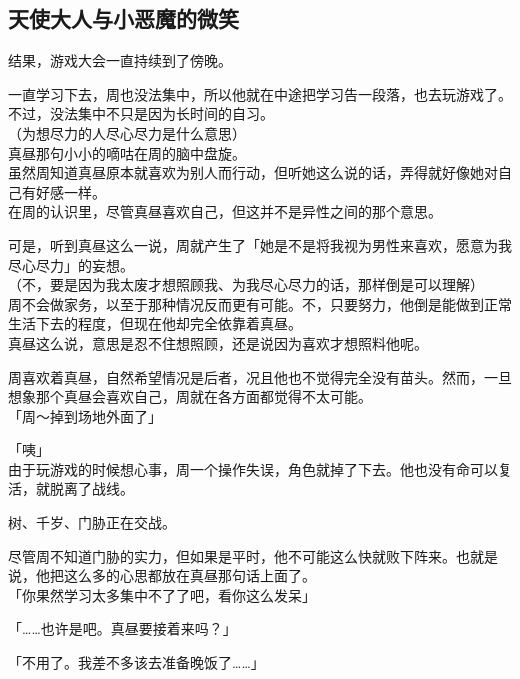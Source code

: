 \subsection{天使大人与小恶魔的微笑}

结果，游戏大会一直持续到了傍晚。

一直学习下去，周也没法集中，所以他就在中途把学习告一段落，也去玩游戏了。不过，没法集中不只是因为长时间的自习。\\

（为想尽力的人尽心尽力是什么意思）\\

真昼那句小小的嘀咕在周的脑中盘旋。\\

虽然周知道真昼原本就喜欢为别人而行动，但听她这么说的话，弄得就好像她对自己有好感一样。\\

在周的认识里，尽管真昼喜欢自己，但这并不是异性之间的那个意思。

可是，听到真昼这么一说，周就产生了「她是不是将我视为男性来喜欢，愿意为我尽心尽力」的妄想。\\

（不，要是因为我太废才想照顾我、为我尽心尽力的话，那样倒是可以理解）\\

周不会做家务，以至于那种情况反而更有可能。不，只要努力，他倒是能做到正常生活下去的程度，但现在他却完全依靠着真昼。\\

真昼这么说，意思是忍不住想照顾，还是说因为喜欢才想照料他呢。

周喜欢着真昼，自然希望情况是后者，况且他也不觉得完全没有苗头。然而，一旦想象那个真昼会喜欢自己，周就在各方面都觉得不太可能。\\

「周～掉到场地外面了」

「咦」\\

由于玩游戏的时候想心事，周一个操作失误，角色就掉了下去。他也没有命可以复活，就脱离了战线。

树、千岁、门胁正在交战。

尽管周不知道门胁的实力，但如果是平时，他不可能这么快就败下阵来。也就是说，他把这么多的心思都放在真昼那句话上面了。\\

「你果然学习太多集中不了了吧，看你这么发呆」

「……也许是吧。真昼要接着来吗？」

「不用了。我差不多该去准备晚饭了……」\\

